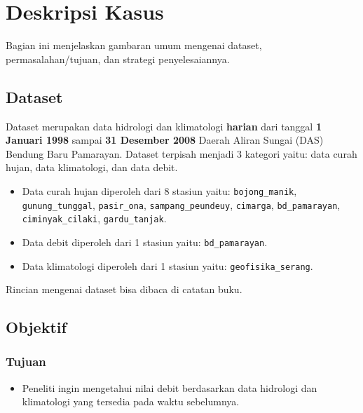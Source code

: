 \documentclass[11pt]{article}
\providecommand{\tightlist}{%
      \setlength{\itemsep}{0pt}\setlength{\parskip}{0pt}}
\let\oldsection\section
\renewcommand\section{\clearpage\oldsection}
\begin{document}
    \hypertarget{deskripsi-kasus}{%
\section{Deskripsi Kasus}\label{deskripsi-kasus}}

Bagian ini menjelaskan gambaran umum mengenai dataset,
permasalahan/tujuan, dan strategi penyelesaiannya.

    \hypertarget{dataset}{%
\subsection{Dataset}\label{dataset}}

Dataset merupakan data hidrologi dan klimatologi \textbf{harian} dari
tanggal \textbf{1 Januari 1998} sampai \textbf{31 Desember 2008} Daerah
Aliran Sungai (DAS) Bendung Baru Pamarayan. Dataset terpisah menjadi 3
kategori yaitu: data curah hujan, data klimatologi, dan data debit.

\begin{itemize}
\tightlist
\item
  Data curah hujan diperoleh dari 8 stasiun yaitu:
  \texttt{bojong\_manik}, \texttt{gunung\_tunggal}, \texttt{pasir\_ona},
  \texttt{sampang\_peundeuy}, \texttt{cimarga}, \texttt{bd\_pamarayan},
  \texttt{ciminyak\_cilaki}, \texttt{gardu\_tanjak}.
\item
  Data debit diperoleh dari 1 stasiun yaitu: \texttt{bd\_pamarayan}.
\item
  Data klimatologi diperoleh dari 1 stasiun yaitu:
  \texttt{geofisika\_serang}.
\end{itemize}

Rincian mengenai dataset bisa dibaca di catatan buku.

    \hypertarget{objektif}{%
\subsection{Objektif}\label{objektif}}

\hypertarget{tujuan}{%
\subsubsection{Tujuan}\label{tujuan}}

\begin{itemize}
\tightlist
\item
  Peneliti ingin mengetahui nilai debit berdasarkan data hidrologi dan
  klimatologi yang tersedia pada waktu sebelumnya.
\end{itemize}
\end{document}
